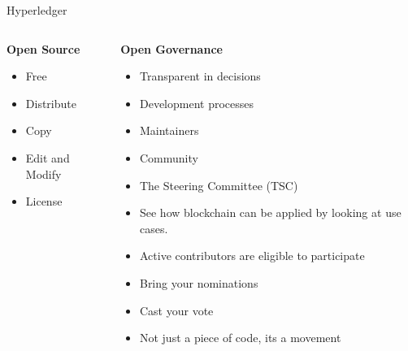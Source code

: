 \documentclass[pdf,table]{beamer}
\begin{document}
\begin{frame}{Hyperledger}
	\begin{columns}[T]
		\begin{column}{0.40\textwidth}
		{\bf Open Source}
			\begin{itemize}
				\item Free
				\item Distribute
				\item Copy
				\item Edit and Modify
				\item License
			\end{itemize}
		\end{column}
		\begin{column}{0.58\textwidth}
			{\bf Open Governance}
			\begin{itemize}
				\item Transparent in decisions
				\item Development processes
				\item Maintainers
				\item Community
				\item The Steering Committee (TSC)
				\item See how blockchain can be applied by looking at use cases.
				\item Active contributors are eligible to participate
				\item Bring your nominations
				\item Cast your vote
				\item Not just a piece of code, its a movement
			\end{itemize}
		\end{column}
	\end{columns}	
\end{frame}
\end{document}
